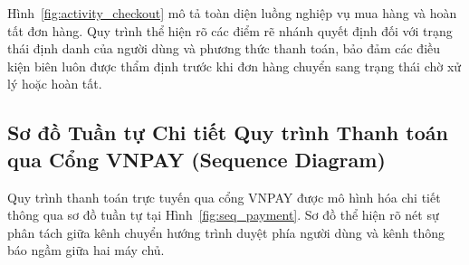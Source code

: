 Hình~\ref{fig:activity_checkout} mô tả toàn diện luồng nghiệp vụ mua hàng và hoàn tất đơn hàng. Quy trình thể hiện rõ các điểm rẽ nhánh quyết định đối với trạng thái định danh của người dùng và phương thức thanh toán, bảo đảm các điều kiện biên luôn được thẩm định trước khi đơn hàng chuyển sang trạng thái chờ xử lý hoặc hoàn tất.

\subsection{Sơ đồ Tuần tự Chi tiết Quy trình Thanh toán qua Cổng VNPAY (Sequence Diagram)}
Quy trình thanh toán trực tuyến qua cổng VNPAY được mô hình hóa chi tiết thông qua sơ đồ tuần tự tại Hình~\ref{fig:seq_payment}. Sơ đồ thể hiện rõ nét sự phân tách giữa kênh chuyển hướng trình duyệt phía người dùng và kênh thông báo ngầm giữa hai máy chủ.

